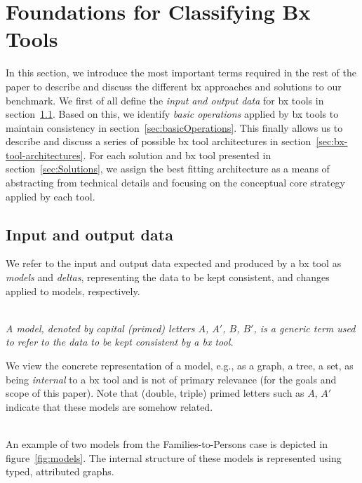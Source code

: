\section{Foundations for Classifying Bx Tools}
\label{sec:Foundations}


In this section, we introduce the most important terms required in the rest of the paper to describe and discuss the different bx approaches and solutions to our benchmark.
We first of all define the \emph{input and output data} for bx tools in section~\ref{sec:io-data}.
Based on this, we identify \emph{basic operations} applied by bx tools to maintain consistency in section~\ref{sec:basicOperations}.
This finally allows us to describe and discuss a series of possible bx tool architectures in section~\ref{sec:bx-tool-architectures}.
For each solution and bx tool presented in section~\ref{sec:Solutions}, we assign the best fitting architecture as a means of abstracting from technical details and focusing on the conceptual core strategy applied by each tool.   

\subsection{Input and output data}
\label{sec:io-data}

We refer to the input and output data expected and produced by a bx tool as \emph{models} and \emph{deltas}, representing the data to be kept consistent, and changes applied to models, respectively.  

\begin{definition}[Model]
\label{def: model}~\\
\emph{A model, denoted by capital (primed) letters $A$, $A'$, $B$, $B'$, is a generic term used to refer to the data to be kept consistent by a bx tool.}
\end{definition}
%
We view the concrete representation of a model, e.g., as a graph, a tree, a set, as being \emph{internal} to a bx tool and is not of primary relevance (for the goals and scope of this paper).
Note that (double, triple) primed letters such as $A$, $A'$ indicate that these models are somehow related.

\begin{example}[Models]~\\
An example of two models from the Families-to-Persons case is depicted in figure~\ref{fig:models}.
The internal structure of these models is represented using typed, attributed graphs.
\end{example}

